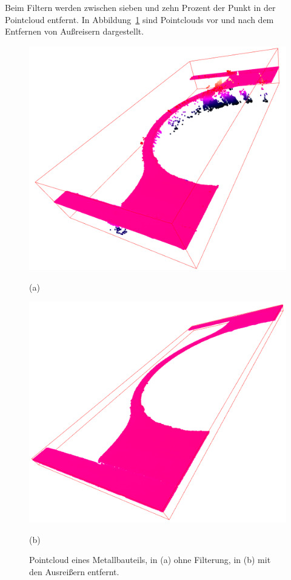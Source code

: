 Beim Filtern werden zwischen sieben und zehn Prozent der Punkt in der Pointcloud entfernt.
In Abbildung~\ref{fig:pcs} sind Pointclouds vor und nach dem Entfernen von Außreisern 
dargestellt.

\begin{figure}[H]
    \centering
    \begin{minipage}{0.45\textwidth}
        \centering
        \includegraphics[width=\textwidth]{images/pc_with_outliers.PNG} %
        \caption*{(a)}
    \end{minipage}\hfill
    \begin{minipage}{0.45\textwidth}
        \centering
        \includegraphics[width=\textwidth]{images/pc_without_outliers.PNG} %
        \caption*{(b)}
    \end{minipage}
    \caption{Pointcloud eines Metallbauteils, in (a) ohne Filterung,
    in (b) mit den Ausreißern entfernt.}
    \label{fig:pcs}
\end{figure}



